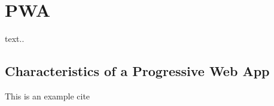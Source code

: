 \section{PWA}
\label{sec:theorieC}

text..

\subsection{Characteristics of a Progressive Web App}
\label{sec:theorieCa}

This is an example cite \cite[p.~42-404]{liebelProgressiveWebApps2019}
